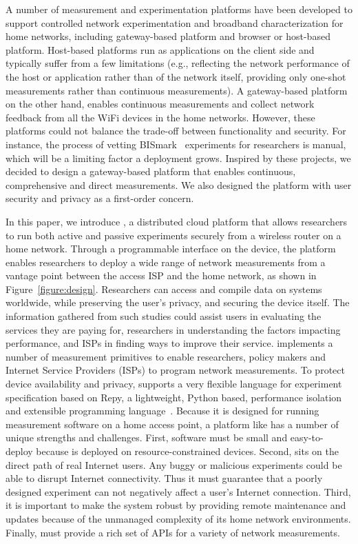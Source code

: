 A number of measurement and experimentation platforms have been developed to 
support controlled network experimentation and broadband characterization 
for home networks, including gateway-based platform\cite{bajpai2014lessons,
samknows,183951,yiakoumis2014behop} and browser or host-based platform\cite{
dhawan2012fathom,kreibich2010netalyzr,sanchez2014measurement}. Host-based 
platforms run as applications on the client side and typically suffer from a 
few limitations (e.g., reflecting the network performance of the host or 
application rather than of the network itself, providing only one-shot 
measurements rather than continuous measurements). A gateway-based platform 
on the other hand, enables continuous measurements and collect network 
feedback from all the WiFi devices in the home networks. However, these 
platforms could not balance the trade-off between functionality and security.
 For instance, the process of vetting BISmark~\cite{183951} experiments for 
researchers is manual, which will be a limiting factor a deployment grows. 
Inspired by these projects, we decided to design a gateway-based platform 
that enables continuous, comprehensive and direct measurements. We also 
designed the platform with user security and privacy as a first-order concern.
 
In this paper, we introduce \sysname, a distributed cloud platform that 
allows researchers to run both active and passive experiments securely from 
a wireless router on a home network. Through a programmable interface on the 
device, the platform enables researchers to deploy a wide range of network 
measurements from a vantage point between the access ISP and the home 
network, as shown in Figure~\ref{figure:design}. Researchers can access and 
compile data on systems worldwide, while preserving the user's privacy, and 
securing the device itself. The information gathered from such studies could 
assist users in evaluating the services they are paying for, researchers in 
understanding the factors impacting performance, and ISPs in finding ways to 
improve their service. \sysname implements a number of measurement 
primitives to enable researchers, policy makers and Internet Service 
Providers (ISPs) to program network measurements. To protect device 
availability and privacy, \sysname supports a very flexible language for 
experiment specification based on Repy, a lightweight, Python based, 
performance isolation and extensible programming language~\cite{
cappos2010retaining}. Because it is designed for running measurement 
software on a home access point, a platform like \sysname has a number of 
unique strengths and challenges. First, software must be small and easy-to-
deploy because \sysname is deployed on resource-constrained devices. Second, 
\sysname sits on the direct path of real Internet users. Any buggy or 
malicious experiments could be able to disrupt Internet connectivity. Thus 
it must guarantee that a poorly designed experiment can not negatively 
affect a user's Internet connection. Third, it is important to make the 
system robust by providing remote maintenance and updates because of the 
unmanaged complexity of its home network environments. Finally, \sysname 
must provide a rich set of APIs for a variety of network measurements. 

